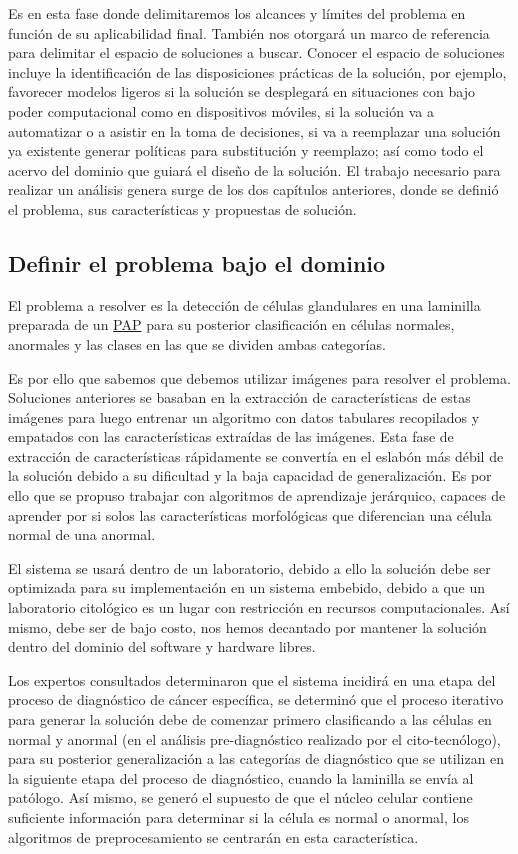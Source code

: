 Es en esta fase donde delimitaremos los alcances y límites del problema en
función de su aplicabilidad final. También nos otorgará un marco de referencia
para delimitar el espacio de soluciones a buscar. Conocer el espacio de
soluciones incluye la identificación de las disposiciones prácticas de la
solución, por ejemplo, favorecer modelos ligeros si la solución se desplegará en
situaciones con bajo poder computacional como en dispositivos móviles, si la
solución va a automatizar o a asistir en la toma de decisiones, si va a
reemplazar una solución ya existente generar políticas para substitución y
reemplazo; así como todo el acervo del dominio que guiará el diseño de la
solución. El trabajo necesario para realizar un análisis genera surge de los dos
capítulos anteriores, donde se definió el problema, sus características y
propuestas de solución.

\subsection{Definir el problema bajo el dominio}

El problema a resolver es la detección de células glandulares en una laminilla
preparada de un \hyperlink{abbr}{PAP} para su posterior clasificación en
células normales, anormales y las clases en las que se dividen ambas categorías.

Es por ello que sabemos que debemos utilizar imágenes para resolver el problema.
Soluciones anteriores se basaban en la extracción de características de estas
imágenes para luego entrenar un algoritmo con datos tabulares recopilados y
empatados con las características extraídas de las imágenes. Esta fase de
extracción de características rápidamente se convertía en el eslabón más débil
de la solución debido a su dificultad y la baja capacidad de generalización. Es
por ello que se propuso trabajar con algoritmos de aprendizaje jerárquico,
capaces de aprender por si solos las características morfológicas que
diferencian una célula normal de una anormal.

El sistema se usará dentro de un laboratorio, debido a ello la solución debe ser
optimizada para su implementación en un sistema embebido, debido a que un
laboratorio citológico es un lugar con restricción en recursos computacionales.
Así mismo, debe ser de bajo costo, nos hemos decantado por mantener
la solución dentro del dominio del software y hardware libres.

Los expertos consultados determinaron que el sistema incidirá en una etapa del
proceso de diagnóstico de cáncer específica, se determinó que el proceso
iterativo para generar la solución debe de comenzar primero clasificando a las
células en normal y anormal (en el análisis pre-diagnóstico realizado por el
cito-tecnólogo), para su posterior generalización a las categorías de
diagnóstico que se utilizan en la siguiente etapa del proceso de diagnóstico,
cuando la laminilla se envía al patólogo. Así mismo, se generó el supuesto de
que el núcleo celular contiene suficiente información para determinar si la
célula es normal o anormal, los algoritmos de preprocesamiento se centrarán en
esta característica.

